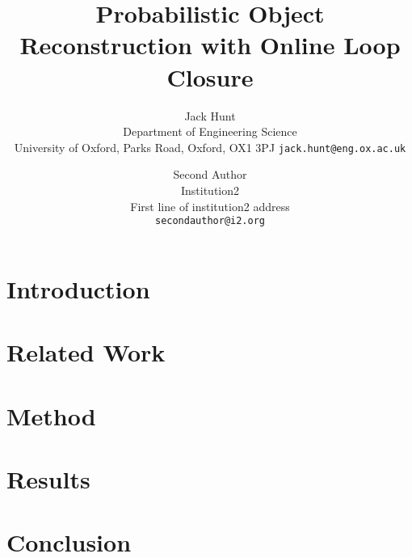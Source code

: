 \documentclass[10pt,twocolumn,letterpaper]{article}
\begin{document}
\title{Probabilistic Object Reconstruction with Online Loop Closure}

\author{Jack Hunt\\
Department of Engineering Science\\
University of Oxford,
Parks Road, Oxford, OX1 3PJ
{\tt\small jack.hunt@eng.ox.ac.uk}
\and
Second Author\\
Institution2\\
First line of institution2 address\\
{\tt\small secondauthor@i2.org}
}

\maketitle

\begin{abstract}

\end{abstract}

\section{Introduction}
\label{sec:introduction}



\section{Related Work}
\label{sec:lit_review}



\section{Method}



\section{Results}
\label{sec:results}



\section{Conclusion}
\label{sec:discussion}




{\small


}
\end{document}
